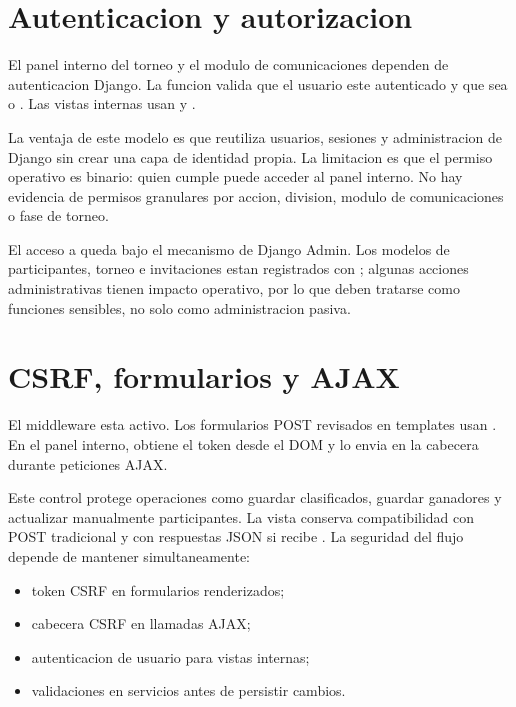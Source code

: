 \section{Autenticacion y autorizacion}
\label{sec:seguridad-auth}

El panel interno del torneo y el modulo de comunicaciones dependen de autenticacion Django. La funcion  valida que el usuario este autenticado y que sea  o . Las vistas internas usan  y .

La ventaja de este modelo es que reutiliza usuarios, sesiones y administracion de Django sin crear una capa de identidad propia. La limitacion es que el permiso operativo es binario: quien cumple  puede acceder al panel interno. No hay evidencia de permisos granulares por accion, division, modulo de comunicaciones o fase de torneo.

El acceso a  queda bajo el mecanismo de Django Admin. Los modelos de participantes, torneo e invitaciones estan registrados con ; algunas acciones administrativas tienen impacto operativo, por lo que deben tratarse como funciones sensibles, no solo como administracion pasiva.

\section{CSRF, formularios y AJAX}
\label{sec:seguridad-csrf}

El middleware  esta activo. Los formularios POST revisados en templates usan . En el panel interno,  obtiene el token desde el DOM y lo envia en la cabecera  durante peticiones AJAX.

Este control protege operaciones como guardar clasificados, guardar ganadores y actualizar manualmente participantes. La vista  conserva compatibilidad con POST tradicional y con respuestas JSON si recibe . La seguridad del flujo depende de mantener simultaneamente:

\begin{itemize}
  \item token CSRF en formularios renderizados;
  \item cabecera CSRF en llamadas AJAX;
  \item autenticacion de usuario para vistas internas;
  \item validaciones en servicios antes de persistir cambios.
\end{itemize}

